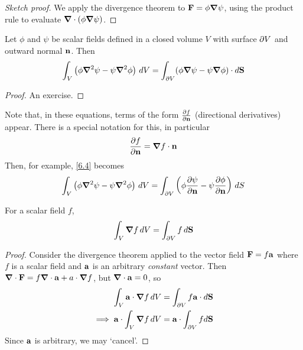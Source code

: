 \documentclass{../../template/note}
\begin{document}
    \begin{proof}[Sketch proof]
        We apply the divergence theorem to \(\V F = \phi \grad \psi\), using the product rule to evaluate \(\div(\phi \grad \psi)\).
    \end{proof}
    
    \begin{proposition}
        \label{6.4}
        Let \(\phi\) and \(\psi\) be scalar fields defined in a closed volume \(V\) with surface \(\partial V\) and outward normal \(\V n\). Then
        \begin{align*}
            \int_V \left(\phi \grad^2 \psi - \psi \grad^2 \phi\right) \D V = \int_{\pr V} (\phi \grad \psi - \psi \grad \phi) \cdot d\V S
        \end{align*}
    \end{proposition}
    
    \begin{proof}
        An exercise.
    \end{proof}
    
    Note that, in these equations, terms of the form \(\pd{f}{\V n}\) (directional derivatives) appear. There is a special notation for this, in particular
    \begin{align*}
        \pd{f}{\V n} = \grad f \cdot \V n
    \end{align*}
    Then, for example, \cref{6.4} becomes
    \begin{align*}
        \int_V \left(\phi \grad^2 \psi - \psi \grad^2 \phi\right) \D V = \int_{\pr V} \left(\phi \pd{\psi}{\V n} - \psi \pd{\phi}{\V n}\right) \D S
    \end{align*}

    \begin{proposition}
        \label{6.5}
        For a scalar field \(f\),
        \begin{align*}
            \int_V \grad f \D V = \int_{\pr V} f \, d\V S
        \end{align*}
    \end{proposition}

    \begin{proof}
        Consider the divergence theorem applied to the vector field \(\V F = f\V a\) where \(f\) is a scalar field and \(\V a\) is an arbitrary \emph{constant} vector. Then \(\div \V F = f \div \V a + a \cdot \grad f\), but \(\div \V a = 0\), so
        \begin{align*}
            \int_V \V a \cdot \grad f \D V &= \int_{\pr V} f \V a \cdot d\V S \\
            \implies \V a \cdot \int_V \grad f \D V &= \V a \cdot \int_{\pr V} f d\V S
        \end{align*}
        Since \(\V a\) is arbitrary, we may `cancel'.
    \end{proof}
    
\end{document}
